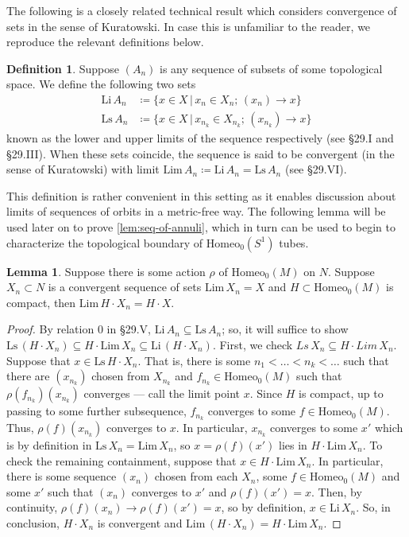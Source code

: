 \documentclass[10pt, oneside]{article}
\newcommand{\homeo}[1][S^1]{\text{Homeo}_0(#1)}
\newcommand{\klim}[1]{\text{Lim}\,#1}
\newcommand{\li}[1]{\text{Li}\,#1}
\newcommand{\ls}[1]{\text{Ls}\,#1}
\theoremstyle{definition}
\newtheorem{defn}{Definition}[section]
\newtheorem{lem}{Lemma}[section]
\theoremstyle{definition}
\begin{document}
The following is a closely related technical result which considers convergence of sets in the sense of Kuratowski\cite{kuratowski:TopologyI}. In case this is unfamiliar to the reader, we reproduce the relevant definitions below. 
\begin{defn}
    Suppose $(A_n)$ is any sequence of subsets of some topological space. We define the following two sets
    \begin{align*}
        \li{A_n}&\coloneqq\{x\in X\,\vert\, x_n\in X_n;\, (x_n)\to x\} \\
        \ls{A_n}&\coloneqq\{x\in X\,\vert\, x_{n_k}\in X_{n_k};\, (x_{n_k})\to x\}
    \end{align*}
    known as the lower and upper limits of the sequence respectively (see \cite{kuratowski:TopologyI} \S29.I and \S29.III). When these sets coincide, the sequence is said to be convergent (in the sense of Kuratowski) with limit $\klim{A_n} \coloneqq \li{A_n} = \ls{A_n}$ (see \cite{kuratowski:TopologyI} \S29.VI).
\end{defn}

This definition is rather convenient in this setting as it enables discussion about limits of sequences of orbits in a metric-free way. The following lemma will be used later on to prove \cref{lem:seq-of-annuli}, which in turn can be used to begin to characterize the topological boundary of $\homeo$ tubes.

\begin{lem}\label{lem:union-over-cpct-k-lim}
    Suppose there is some action $\rho$ of $\homeo[M]$ on $N$. Suppose $X_n \subset N$ is a convergent sequence of sets $\klim{X_n} = X$ and $H\subset\homeo[M]$ is compact, then $\klim{H\cdot X_n} = H\cdot X$.
\end{lem}
\begin{proof}
    By relation 0 in \cite{kuratowski:TopologyI} \S29.V, $\li{A_n}\subseteq\ls{A_n}$; so, it will suffice to show $\ls{(H\cdot X_n)}\subseteq H\cdot \klim{X_n}\subseteq\li{(H\cdot X_n)}$. First, we check $\mathit{\ls{X_n}\subseteq H\cdot\klim{X_n}}$. Suppose that $x\in \ls{H\cdot X_n}$. That is, there is some $n_1 < \dots < n_k < \dots$ such that there are $(x_{n_k})$ chosen from $X_{n_k}$ and $f_{n_k}\in\homeo[M]$ such that $\rho(f_{n_k})(x_{n_k})$ converges --- call the limit point $x$. Since $H$ is compact, up to passing to some further subsequence, $f_{n_k}$ converges to some $f\in\homeo[M]$. Thus, $\rho(f)(x_{n_k})$ converges to $x$. In particular, $x_{n_k}$ converges to some $x'$ which is by definition in $\ls{X_n} =\klim{X_n}$, so $x=\rho(f)(x')$ lies in $H\cdot \klim{X_n}$. To check the remaining containment, suppose that $x\in H\cdot\klim{X_n}$. In particular, there is some sequence $(x_n)$ chosen from each $X_n$, some $f\in\homeo[M]$ and some $x'$ such that $(x_n)$ converges to $x'$ and $\rho(f)(x')=x$. Then, by continuity, $\rho(f)(x_n)\to\rho(f)(x')=x$, so by definition, $x\in\li{X_n}$. So, in conclusion, $H\cdot X_n$ is convergent and $\klim{(H\cdot X_n)} = H\cdot\klim{X_n}$.
\end{proof}
\end{document}
